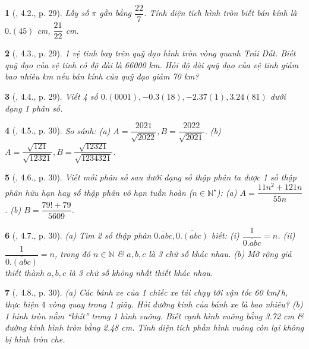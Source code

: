 \documentclass{article}
\newtheorem{baitoan}{}
\begin{document}
\begin{baitoan}[\cite{Binh_boi_duong_Toan_7_tap_1}, 4.2., p. 29]
	Lấy số $\pi$ gần bằng $\dfrac{22}{7}$. Tính diện tích hình tròn biết bán kính là $0.(45)$ {\rm cm}, $\dfrac{21}{22}$ {\rm cm}.
\end{baitoan}

\begin{baitoan}[\cite{Binh_boi_duong_Toan_7_tap_1}, 4.3., p. 29]
	1 vệ tinh bay trên quỹ đạo hình tròn vòng quanh Trái Đất. Biết quỹ đạo của vệ tinh có độ dài là {\rm66000 km}. Hỏi độ dài quỹ đạo của vệ tinh giảm bao nhiêu {\rm km} nếu bán kính của quỹ đạo giảm {\rm70 km}?
\end{baitoan}

\begin{baitoan}[\cite{Binh_boi_duong_Toan_7_tap_1}, 4.4., p. 29]
	Viết 4 số $0.(0001),-0.3(18),-2.37(1),3.24(81)$ dưới dạng 1 phân số.
\end{baitoan}

\begin{baitoan}[\cite{Binh_boi_duong_Toan_7_tap_1}, 4.5., p. 30]
	So sánh: (a) $A = \dfrac{2021}{\sqrt{2022}},B = \dfrac{2022}{\sqrt{2021}}$. (b) $A = \dfrac{\sqrt{121}}{\sqrt{12321}},B = \dfrac{\sqrt{12321}}{\sqrt{1234321}}$.
\end{baitoan}

\begin{baitoan}[\cite{Binh_boi_duong_Toan_7_tap_1}, 4.6., p. 30]
	Viết mỗi phân số sau dưới dạng số thập phân ta được 1 số thập phân hữu hạn hay số thập phân vô hạn tuần hoàn ($n\in\mathbb{N}^\star$): (a) $A = \dfrac{11n^2 + 121n}{55n}$. (b) $B = \dfrac{79! + 79}{5609}$.
\end{baitoan}

\begin{baitoan}[\cite{Binh_boi_duong_Toan_7_tap_1}, 4.7., p. 30]
	(a) Tìm 2 số thập phân $\overline{0.abc},\overline{0.(abc)}$ biết: (i) $\dfrac{1}{\overline{0.abc}} = n$. (ii) $\dfrac{1}{\overline{0.(abc)}} = n$, trong đó $n\in\mathbb{N}$ \& $a,b,c$ là 3 chữ số khác nhau. (b) Mở rộng giả thiết thành $a,b,c$ là 3 chữ số không nhất thiết khác nhau.
\end{baitoan}

\begin{baitoan}[\cite{Binh_boi_duong_Toan_7_tap_1}, 4.8., p. 30]
	(a) Các bánh xe của 1 chiếc xe tải chạy tới vận tốc {\rm60 km{\tt/}h}, thực hiện $4$ vòng quay trong 1 giây. Hỏi đường kính của bánh xe là bao nhiêu? (b) 1 hình tròn nằm ``khít'' trong 1 hình vuông. Biết cạnh hình vuông bằng {\rm3.72 cm} \& đường kính hình tròn bằng {\rm2.48 cm}. Tính diện tích phần hình vuông còn lại không bị hình tròn che.
\end{baitoan}
\end{document}
